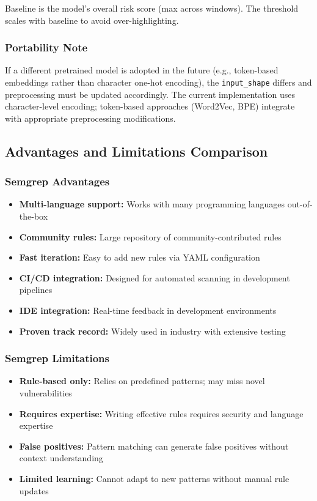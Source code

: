 Baseline is the model's overall risk score (max across windows). The threshold scales with baseline to avoid over-highlighting.

\subsubsection{Portability Note}
\label{sec:ml_portability}

If a different pretrained model is adopted in the future (e.g., token-based embeddings rather than character one-hot encoding), the \texttt{input\_shape} differs and preprocessing must be updated accordingly. The current implementation uses character-level encoding; token-based approaches (Word2Vec, BPE) integrate with appropriate preprocessing modifications.

\subsection{Advantages and Limitations Comparison}
\label{sec:advantages_limitations_comparison}

\subsubsection{Semgrep Advantages}
\label{sec:semgrep_advantages}

\begin{itemize}
	\item \textbf{Multi-language support:} Works with many programming languages out-of-the-box
	\item \textbf{Community rules:} Large repository of community-contributed rules
	\item \textbf{Fast iteration:} Easy to add new rules via YAML configuration
	\item \textbf{CI/CD integration:} Designed for automated scanning in development pipelines
	\item \textbf{IDE integration:} Real-time feedback in development environments
	\item \textbf{Proven track record:} Widely used in industry with extensive testing
\end{itemize}

\subsubsection{Semgrep Limitations}
\label{sec:semgrep_limitations}

\begin{itemize}
	\item \textbf{Rule-based only:} Relies on predefined patterns; may miss novel vulnerabilities
	\item \textbf{Requires expertise:} Writing effective rules requires security and language expertise
	\item \textbf{False positives:} Pattern matching can generate false positives without context understanding
	\item \textbf{Limited learning:} Cannot adapt to new patterns without manual rule updates
\end{itemize}

